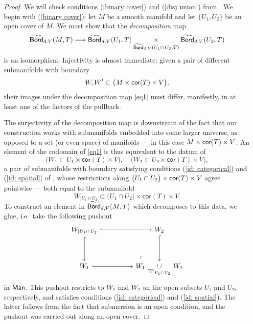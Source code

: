 \begin{proof}
    We will check conditions (\ref{binary cover}) and (\ref{disj union}) from . We begin with (\ref{binary cover}): let $M$ be a smooth manifold and let $\{U_1,U_2\}$ be an open cover of $M$. We must show that the \emph{decomposition} map
    \begin{equation}
        \label{eq1}
        \widetilde{\operatorname{\mathsf{Bord}}}_{d,V}(M,T) \longrightarrow \widetilde{\operatorname{\mathsf{Bord}}}_{d,V}(U_1,T)\underset{\widetilde{\operatorname{\mathsf{Bord}}}_{d,V}(U_1\cap \,U_2,T)}{\times}\widetilde{\operatorname{\mathsf{Bord}}}_{d,V}(U_2,T)
    \end{equation}
    is an isomorphism. Injectivity is almost immediate: given a pair of different submanifolds with boundary 
    \[
    W,W' \subset \big(M\times \operatorname{{\sf cor}}(T)\times V\big),
    \]
    their images under the decomposition map \eqref{eq1} must differ, manifestly, in at least one of the factors of the pullback.
    
     The surjectivity of the decomposition map is downstream of the fact that our construction works with submanifolds embedded into some larger universe, as opposed to a set (or even space) of manifolds --- in this case $M \times \operatorname{{\sf cor}}(T) \times V$. An element of the codomain of \eqref{eq1} is thus equivalent to the datum of
    \begin{equation}
    \big(W_1 \subset U_1 \times \mathsf{cor}(T)\times V\big), \quad \big(W_2 \subset U_2 \times \mathsf{cor}(T)\times V \big),
    \end{equation} 
    a pair of submanifolds with boundary satisfying conditions (\ref{id: categorical}) and (\ref{id: spatial}) of , whose restrictions along $\big(U_1 \cap U_2\big)\times \operatorname{{\sf cor}}(T)\times V$ agree pointwise --- both equal to the submanifold
    \begin{equation}
    W_{|U_{1}\cap U_{2}}\subset \big( U_1\cap U_2\big) \times \mathsf{cor}(T)\times V.
    \end{equation}
    To construct an element in $\widetilde{\operatorname{\mathsf{Bord}}}_{d,V}(M,T)$ which decomposes to this data, we glue, i.e.\ take the following pushout
    \begin{equation}
        \begin{tikzcd}
            {W_{|U_{1}\cap\,U_{2}}} && {W_{2}} \\
            \\
            {W_{1}} && {W_{1}\,\underset{W_{|U_{1}\cap\,U_{2}}}{\cup} \, W_2}
            \arrow[hook, from=1-1, to=1-3]
            \arrow[hook, from=1-1, to=3-1]
            \arrow[hook, from=1-3, to=3-3]
            \arrow[hook, from=3-1, to=3-3]
            \arrow["\lrcorner"{anchor=center, pos=0.125, rotate=180}, draw=none, from=3-3, to=1-1]
        \end{tikzcd}
    \end{equation}
    in $\operatorname{\sf Man}$. This pushout restricts to $W_1$ and $W_2$ on the open subsets $U_1$ and $U_2$, respectively, and satisfies conditions (\ref{id: categorical}) and (\ref{id: spatial}). The latter follows from the fact that submersion is an open condition, and the pushout was carried out along an open cover. 


\end{proof}
